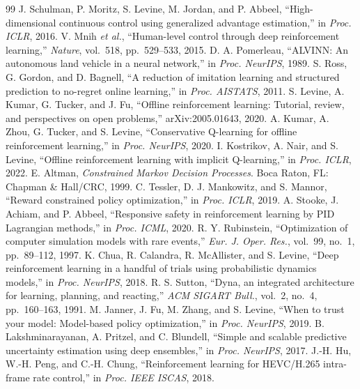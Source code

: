 \documentclass[conference]{IEEEtran}
\begin{document}
\begin{thebibliography}{99}
 J. Schulman, P. Moritz, S. Levine, M. Jordan, and P. Abbeel, ``High-dimensional continuous control using generalized advantage estimation,'' in \emph{Proc. ICLR}, 2016.
 V. Mnih \emph{et al.}, ``Human-level control through deep reinforcement learning,'' \emph{Nature}, vol.~518, pp.~529--533, 2015.
 D. A. Pomerleau, ``ALVINN: An autonomous land vehicle in a neural network,'' in \emph{Proc. NeurIPS}, 1989.
 S. Ross, G. Gordon, and D. Bagnell, ``A reduction of imitation learning and structured prediction to no-regret online learning,'' in \emph{Proc. AISTATS}, 2011.
 S. Levine, A. Kumar, G. Tucker, and J. Fu, ``Offline reinforcement learning: Tutorial, review, and perspectives on open problems,'' arXiv:2005.01643, 2020.
 A. Kumar, A. Zhou, G. Tucker, and S. Levine, ``Conservative Q-learning for offline reinforcement learning,'' in \emph{Proc. NeurIPS}, 2020.
 I. Kostrikov, A. Nair, and S. Levine, ``Offline reinforcement learning with implicit Q-learning,'' in \emph{Proc. ICLR}, 2022.
 E. Altman, \emph{Constrained Markov Decision Processes}. Boca Raton, FL: Chapman \& Hall/CRC, 1999.
 C. Tessler, D. J. Mankowitz, and S. Mannor, ``Reward constrained policy optimization,'' in \emph{Proc. ICLR}, 2019.
 A. Stooke, J. Achiam, and P. Abbeel, ``Responsive safety in reinforcement learning by PID Lagrangian methods,'' in \emph{Proc. ICML}, 2020.
 R. Y. Rubinstein, ``Optimization of computer simulation models with rare events,'' \emph{Eur. J. Oper. Res.}, vol.~99, no.~1, pp.~89--112, 1997.
 K. Chua, R. Calandra, R. McAllister, and S. Levine, ``Deep reinforcement learning in a handful of trials using probabilistic dynamics models,'' in \emph{Proc. NeurIPS}, 2018.
 R. S. Sutton, ``Dyna, an integrated architecture for learning, planning, and reacting,'' \emph{ACM SIGART Bull.}, vol.~2, no.~4, pp.~160--163, 1991.
 M. Janner, J. Fu, M. Zhang, and S. Levine, ``When to trust your model: Model-based policy optimization,'' in \emph{Proc. NeurIPS}, 2019.
 B. Lakshminarayanan, A. Pritzel, and C. Blundell, ``Simple and scalable predictive uncertainty estimation using deep ensembles,'' in \emph{Proc. NeurIPS}, 2017.
 J.-H. Hu, W.-H. Peng, and C.-H. Chung, ``Reinforcement learning for HEVC/H.265 intra-frame rate control,'' in \emph{Proc. IEEE ISCAS}, 2018.

\end{thebibliography}
\end{document}
